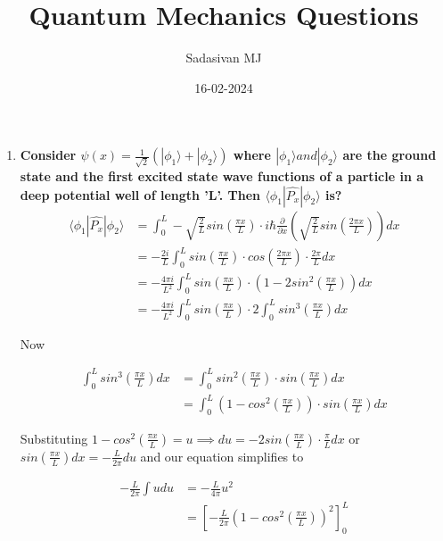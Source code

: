 \documentclass{report}
\title{Quantum Mechanics Questions}
\author{Sadasivan MJ}
\date{16-02-2024}
\begin{document}
    \maketitle
\begin{enumerate}
    
    \item \textbf{Consider $\psi(x) = \frac{1}{\sqrt{2}}(| \phi_1 \rangle + | \phi_2 \rangle)$ where $| \phi_1 \rangle and | \phi_2 \rangle$ are the ground state and the first excited state wave functions of a particle in a deep potential well of length 'L'. Then $\langle \phi_1|\hat{P_x}|\phi_2 \rangle$ is?}
    \vspace{\baselineskip}
\begin{equation*}
    \begin{split}
        \langle \phi_1|\hat{P_x}|\phi_2 \rangle & = \int_{0}^{L} - \sqrt{\frac{2}{L}}sin(\frac{\pi x}{L}) \cdot i\hbar\frac{\partial}{\partial x}( \sqrt{\frac{2}{L}}sin(\frac{2\pi x}{L})) dx \\& = -\frac{2i}{L} \int_{0}^{L}sin(\frac{\pi x}{L}) \cdot cos(\frac{2 \pi x}{L}) \cdot \frac{2 \pi}{L} dx\\& = -\frac{4\pi i}{L^2} \int_{0}^{L}sin(\frac{\pi x}{L}) \cdot (1-2sin^2(\frac{\pi x}{L})) dx \\& = -\frac{4\pi i}{L^2} \int_{0}^{L} sin(\frac{\pi x}{L}) \cdot 2\int_{0}^{L}sin^3(\frac{\pi x}{L}) dx
    \end{split}
\end{equation*}

Now

\begin{equation*}
    \begin{split}
        \int_{0}^{L}sin^3(\frac{\pi x}{L}) dx &= \int_{0}^{L}sin^2(\frac{\pi x}{L}) \cdot sin(\frac{\pi x}{L}) dx \\& = \int_{0}^{L}(1-cos^2(\frac{\pi x}{L})) \cdot sin(\frac{\pi x}{L}) dx
    \end{split}
\end{equation*}

Substituting $1-cos^2(\frac{\pi x}{L}) = u \implies du = -2sin(\frac{\pi x}{L}) \cdot \frac{\pi}{L} dx$ or $sin(\frac{\pi x}{L}) dx = -\frac{L}{2\pi}du$ and our equation simplifies to 

\begin{equation*}
    \begin{split}
         -\frac{L}{2\pi}\int udu &= -\frac{L}{4\pi} u^2 \\&= \left[-\frac{L}{2\pi} (1-cos^2(\frac{\pi x}{L}))^2\right]_0^L
    \end{split}
\end{equation*}


\end{enumerate}
\end{document}
